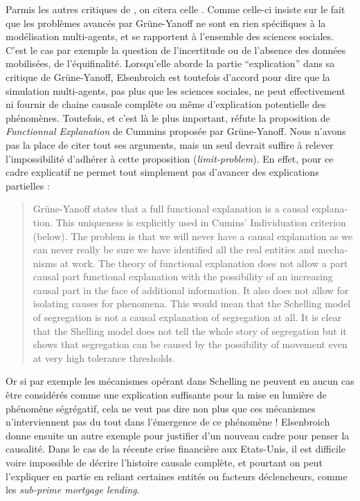 Parmis les autres critiques de \textcite{Yanoff2008}, on citera celle \textcite{Elsenbroich2012}. Comme \textcite{Chattoe2011} celle-ci insiste sur le fait que les problèmes avancés par Grüne-Yanoff ne sont en rien spécifiques à la modélisation multi-agents, et se rapportent à l'ensemble des sciences sociales. C'est le cas par exemple la question de l'incertitude ou de l'absence des données mobilisées, de l'équifinalité. Lorsqu'elle aborde la partie \enquote{explication} dans sa critique de Grüne-Yanoff, Elsenbroich est toutefois d'accord pour dire que la simulation multi-agents, pas plus que les sciences sociales, ne peut effectivement ni fournir de chaine causale complète ou même d'explication potentielle  des phénomènes. Toutefois, et c'est là le plus important, \textcite{Elsenbroich2012} réfute la proposition de \textit{Functionnal Explanation} de Cummins proposée par Grüne-Yanoff. Nous n'avons pas la place de citer tout ses arguments, mais un seul devrait suffire à relever l'impossibilité d'adhérer à cette proposition (\textit{limit-problem}). En effet, pour \textcite{Elsenbroich2012} ce cadre explicatif ne permet tout simplement pas d'avancer des explications partielles : 

\foreignblockquote{english}[\cite{Elsenbroich2012}]{Grüne-Yanoff states that a full functional explanation is a causal explanation. This uniqueness is explicitly used in Cumins' Individuation criterion (below). The problem is that we will never have a causal explanation as we can never really be sure we have identified all the real entities and mechanisms at work. The theory of functional explanation does not allow a part causal part functional explanation with the possibility of an increasing causal part in the face of additional information. It also does not allow for isolating causes for phenomena. This would mean that the Schelling model of segregation is not a causal explanation of segregation at all. It is clear that the Shelling model does not tell the whole story of segregation but it shows that segregation can be caused by the possibility of movement even at very high tolerance thresholds.}

Or si par exemple les mécanismes opérant dans Schelling ne peuvent en aucun cas être considérés comme une explication suffisante pour la mise en lumière de phénomène ségrégatif, cela ne veut pas dire non plus que ces mécanismes n'interviennent pas du tout dans l'émergence de ce phénomène ! Elsenbroich donne ensuite un autre exemple pour justifier d'un nouveau cadre pour penser la causalité. Dans le cas de la récente crise financière aux Etats-Unis, il est difficile voire impossible de décrire l'histoire causale complète, et pourtant on peut l'expliquer en partie en reliant certaines entités ou facteurs déclencheurs, comme les \textit{sub-prime mortgage lending}.

